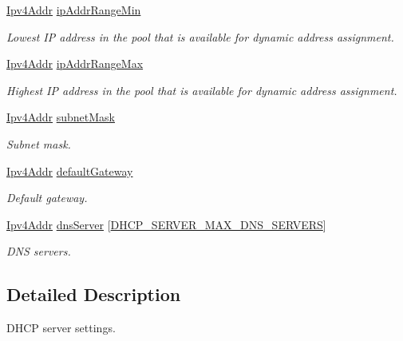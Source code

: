 \begin{DoxyCompactItemize}
\hyperlink{ipv4_8h_a411debb3d770caa0c06d3f73367da37f}{Ipv4\+Addr} \hyperlink{structDhcpServerSettings_abb307df11884b58de9e98b53702abe31}{ip\+Addr\+Range\+Min}
\begin{DoxyCompactList}\small\item\em Lowest IP address in the pool that is available for dynamic address assignment. \end{DoxyCompactList}\item 
\hyperlink{ipv4_8h_a411debb3d770caa0c06d3f73367da37f}{Ipv4\+Addr} \hyperlink{structDhcpServerSettings_ad1ffb003f59319b0c15e43a6a5e4fa7a}{ip\+Addr\+Range\+Max}
\begin{DoxyCompactList}\small\item\em Highest IP address in the pool that is available for dynamic address assignment. \end{DoxyCompactList}\item 
\hyperlink{ipv4_8h_a411debb3d770caa0c06d3f73367da37f}{Ipv4\+Addr} \hyperlink{structDhcpServerSettings_aeedb8313c969d8695966f58053ac54a0}{subnet\+Mask}
\begin{DoxyCompactList}\small\item\em Subnet mask. \end{DoxyCompactList}\item 
\hyperlink{ipv4_8h_a411debb3d770caa0c06d3f73367da37f}{Ipv4\+Addr} \hyperlink{structDhcpServerSettings_ad4b4b4460d2115ea068e05efd78042e1}{default\+Gateway}
\begin{DoxyCompactList}\small\item\em Default gateway. \end{DoxyCompactList}\item 
\hyperlink{ipv4_8h_a411debb3d770caa0c06d3f73367da37f}{Ipv4\+Addr} \hyperlink{structDhcpServerSettings_af77ddb04fecfd94fe7c1259003b18d76}{dns\+Server} \mbox{[}\hyperlink{dhcp__server_8h_aa9e4ab9acf963783ab2e3901b9fe2c45}{D\+H\+C\+P\+\_\+\+S\+E\+R\+V\+E\+R\+\_\+\+M\+A\+X\+\_\+\+D\+N\+S\+\_\+\+S\+E\+R\+V\+E\+RS}\mbox{]}
\begin{DoxyCompactList}\small\item\em D\+NS servers. \end{DoxyCompactList}\end{DoxyCompactItemize}


\subsection{Detailed Description}
D\+H\+CP server settings. 

